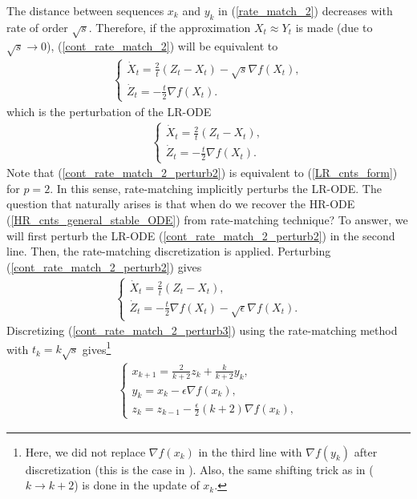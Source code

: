 \documentclass{article}
\theoremstyle{plain}
\theoremstyle{definition}
\theoremstyle{remark}
\begin{document}
The distance between sequences \(x_k\) and \(y_k\) in (\ref{rate_match_2}) decreases with rate of order \(\sqrt{s}\). Therefore, if the approximation \(X_t\approx Y_t\) is made (due to \(\sqrt{s}\rightarrow 0\)), (\ref{cont_rate_match_2}) will be equivalent to
\begin{align}\label{cont_rate_match_2_perturb}
    \left\{\begin{array}{l}
         \dot X_t = \frac{2}{t}(Z_t-X_t)-\sqrt{s}\nabla f(X_t),  \\
          \dot Z_t = -\frac{t}{2}\nabla f(X_t).
    \end{array}
    \right.
\end{align}
which is the perturbation of the LR-ODE
\begin{align}\label{cont_rate_match_2_perturb2}
    \left\{\begin{array}{l}
         \dot X_t = \frac{2}{t}(Z_t-X_t),  \\
          \dot Z_t = -\frac{t}{2}\nabla f(X_t).
    \end{array}
    \right.
\end{align}
Note that (\ref{cont_rate_match_2_perturb2}) is equivalent to (\ref{LR_cnts_form}) for \(p=2\). In this sense, rate-matching implicitly perturbs the LR-ODE. The question that naturally arises is that when do we recover the HR-ODE (\ref{HR_cnts_general_stable_ODE}) from rate-matching technique? To answer, we will first perturb the LR-ODE (\ref{cont_rate_match_2_perturb2}) in the second line. Then, the rate-matching discretization is applied. Perturbing (\ref{cont_rate_match_2_perturb2}) gives
\begin{align}\label{cont_rate_match_2_perturb3}
    \left\{\begin{array}{l}
         \dot X_t = \frac{2}{t}(Z_t-X_t),  \\
          \dot Z_t = -\frac{t}{2}\nabla f(X_t)-\sqrt{\epsilon}\nabla f(X_t).
    \end{array}
    \right.
\end{align}
Discretizing (\ref{cont_rate_match_2_perturb3}) using the rate-matching method with \(t_k=k\sqrt{s}\) gives\footnote{Here, we did not replace \(\nabla f(x_k)\) in the third line with \(\nabla f(y_k)\) after discretization (this is the case in \cite{WibisonoE7351}). Also, the same shifting trick as in \cite{WibisonoE7351} (\(k\rightarrow k+2\)) is done in the update of \(x_{k}\).}
\begin{align}\label{rate_match_3}
    \left\{\begin{array}{l}
    x_{k+1}=\frac{2}{k+2}z_k+\frac{k}{k+2}y_k,\\
    y_{k}=x_k-\epsilon\nabla f(x_k),   \\
    z_{k}=z_{k-1} -\frac{\epsilon}{2} (k+2)\nabla f(x_{k})  ,
    \end{array}\right.
\end{align}
\end{document}
